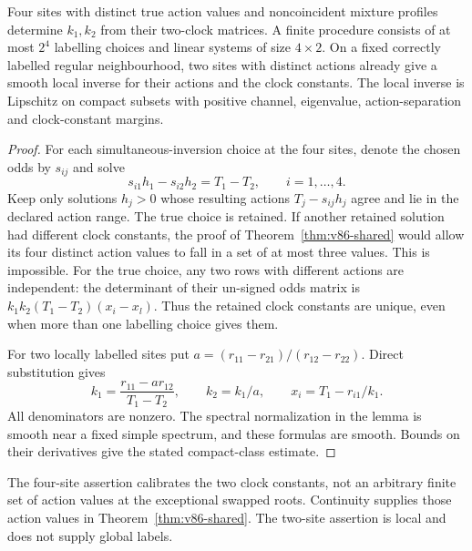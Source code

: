 \begin{proposition}
\label{prop:v86-calibration}
Four sites with distinct true action values and noncoincident mixture
profiles determine $k_1,k_2$ from their two-clock matrices. A finite
procedure consists of at most $2^4$ labelling choices and linear
systems of size $4\times2$. On a fixed correctly labelled regular
neighbourhood, two sites with distinct actions already give a smooth
local inverse for their actions and the clock constants. The local
inverse is Lipschitz on compact subsets with positive channel,
eigenvalue, action-separation and clock-constant margins.
\end{proposition}
\begin{proof}
For each simultaneous-inversion choice at the four sites, denote the
chosen odds by $s_{ij}$ and solve
\begin{equation}\label{eq:v86-calibration-system}
          s_{i1}h_1-s_{i2}h_2=T_1-T_2,\qquad i=1,\ldots,4.
\end{equation}
Keep only solutions $h_j>0$ whose resulting actions
$T_j-s_{ij}h_j$ agree and lie in the declared action range. The true
choice is retained. If another retained solution had different clock
constants, the proof of Theorem~\ref{thm:v86-shared} would allow its
four distinct action values to fall in a set of at most three values.
This is impossible. For the true choice, any two rows with different
actions are independent: the determinant of their un-signed odds
matrix is $k_1k_2(T_1-T_2)(x_i-x_l)$.
Thus the retained clock constants are unique, even when more than one
labelling choice gives them.

For two locally labelled sites put
$a=(r_{11}-r_{21})/(r_{12}-r_{22})$. Direct substitution gives
\begin{equation}\label{eq:v86-explicit-calibration}
 k_1=\frac{r_{11}-a r_{12}}{T_1-T_2},\qquad
 k_2=k_1/a,\qquad x_i=T_1-r_{i1}/k_1.
\end{equation}
All denominators are nonzero. The spectral normalization in the lemma
is smooth near a fixed simple spectrum, and these formulas are smooth.
Bounds on their derivatives give the stated compact-class estimate.
\end{proof}
The four-site assertion calibrates the two clock constants, not an
arbitrary finite set of action values at the exceptional swapped roots.
Continuity supplies those action values in Theorem~\ref{thm:v86-shared}.
The two-site assertion is local and does not supply global labels.

